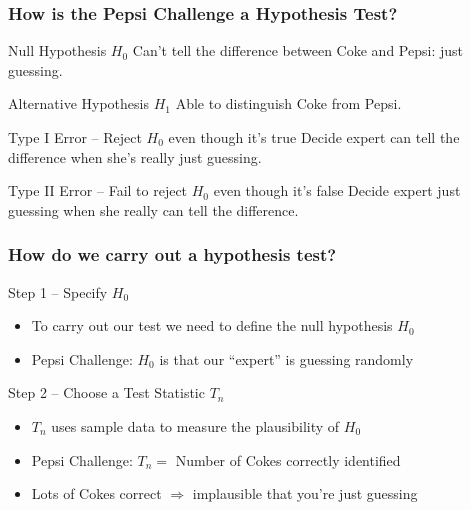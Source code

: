\begin{frame}
\begin{columns}
\begin{column}{6cm}
\end{column} 
\end{columns} 

\end{frame}
\begin{frame}
\frametitle{How is the Pepsi Challenge a Hypothesis Test?}
	\begin{block}{Null Hypothesis $H_0$}
		Can't tell the difference between Coke and Pepsi: just guessing. \pause
\end{block}
	\begin{block}{Alternative Hypothesis $H_1$}
	Able to distinguish Coke from Pepsi.\pause
\end{block}
	\begin{block}{Type I Error -- Reject $H_0$ even though it's true} 
	Decide expert can tell the difference when she's really just guessing. \pause
\end{block}
	\begin{block}{Type II Error -- Fail to reject $H_0$ even though it's false}
	Decide expert just guessing when she really can tell the difference. 
\end{block}
\end{frame}
\begin{frame}
  \frametitle{How do we carry out a hypothesis test?}

  \begin{block}{Step 1 -- Specify $H_0$}
   \begin{itemize}
     \item To carry out our test we need to define the null hypothesis $H_0$ 
     \item Pepsi Challenge: $H_0$ is that our ``expert'' is guessing randomly
   \end{itemize}
  \end{block}

  \pause

  \begin{block}{Step 2 -- Choose a Test Statistic $T_n$}
    \begin{itemize}
      \item $T_n$ uses sample data to measure the plausibility of $H_0$
      \item Pepsi Challenge: $T_n =$ Number of Cokes correctly identified
      \item Lots of Cokes correct $\Rightarrow$ implausible that you're just guessing
    \end{itemize}
  \end{block}


\end{frame}

